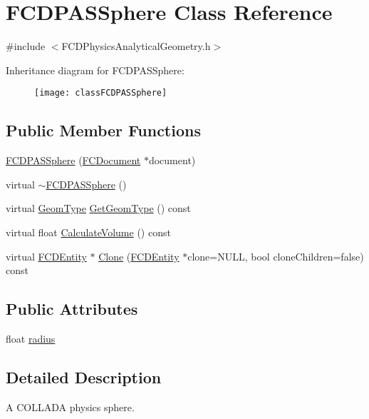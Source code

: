 \hypertarget{classFCDPASSphere}{
\section{FCDPASSphere Class Reference}
\label{classFCDPASSphere}
}


{\ttfamily \#include $<$FCDPhysicsAnalyticalGeometry.h$>$}

Inheritance diagram for FCDPASSphere:\begin{figure}[H]
\begin{center}
\leavevmode
\texttt{[image: classFCDPASSphere]}
\end{center}
\end{figure}
\subsection*{Public Member Functions}
\begin{DoxyCompactItemize}
\item 
\hyperlink{classFCDPASSphere_ab89e1b83bbf44c6c790b9bb38513d775}{FCDPASSphere} (\hyperlink{classFCDocument}{FCDocument} $\ast$document)
\item 
virtual \hyperlink{classFCDPASSphere_a9627e32c6a4f05cd9f0a88304e0c6d95}{$\sim$FCDPASSphere} ()
\item 
virtual \hyperlink{classFCDPhysicsAnalyticalGeometry_a511583406e5c6a1bb5bd84c0453a452c}{GeomType} \hyperlink{classFCDPASSphere_a7c3c557f235b2362784314887c4784e3}{GetGeomType} () const 
\item 
virtual float \hyperlink{classFCDPASSphere_a67cdef90f4d04d51cb93830b198d8486}{CalculateVolume} () const 
\item 
virtual \hyperlink{classFCDEntity}{FCDEntity} $\ast$ \hyperlink{classFCDPASSphere_a3714e903e359b1e0fb11daf84af1b018}{Clone} (\hyperlink{classFCDEntity}{FCDEntity} $\ast$clone=NULL, bool cloneChildren=false) const 
\end{DoxyCompactItemize}
\subsection*{Public Attributes}
\begin{DoxyCompactItemize}
\item 
float \hyperlink{classFCDPASSphere_a362d190937209f56c8beb0f13df03cf8}{radius}
\end{DoxyCompactItemize}


\subsection{Detailed Description}
A COLLADA physics sphere. 

